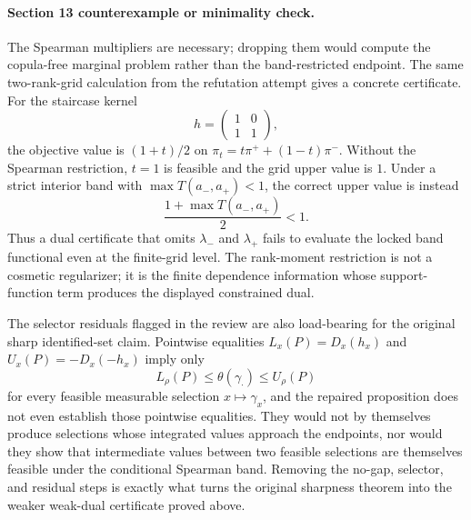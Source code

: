 \paragraph{Section 13 counterexample or minimality check.}
The Spearman multipliers are necessary; dropping them would compute the copula-free marginal problem rather than the band-restricted endpoint.  The same two-rank-grid calculation from the refutation attempt gives a concrete certificate.  For the staircase kernel
\[
h=\begin{pmatrix}1&0\\1&1\end{pmatrix},
\]
the objective value is \((1+t)/2\) on \(\pi_t=t\pi^+ +(1-t)\pi^-\).  Without the Spearman restriction, \(t=1\) is feasible and the grid upper value is \(1\).  Under a strict interior band with \(\max T(a_-,a_+)<1\), the correct upper value is instead
\[
\frac{1+\max T(a_-,a_+)}{2}<1.
\]
Thus a dual certificate that omits \(\lambda_-\) and \(\lambda_+\) fails to evaluate the locked band functional even at the finite-grid level.  The rank-moment restriction is not a cosmetic regularizer; it is the finite dependence information whose support-function term produces the displayed constrained dual.

The selector residuals flagged in the review are also load-bearing for the original sharp identified-set claim.  Pointwise equalities \(L_x(P)=D_x(h_x)\) and \(U_x(P)=-D_x(-h_x)\) imply only
\[
L_\rho(P)\le \theta(\gamma_\cdot)\le U_\rho(P)
\]
for every feasible measurable selection \(x\mapsto\gamma_x\), and the repaired proposition does not even establish those pointwise equalities.  They would not by themselves produce selections whose integrated values approach the endpoints, nor would they show that intermediate values between two feasible selections are themselves feasible under the conditional Spearman band.  Removing the no-gap, selector, and residual steps is exactly what turns the original sharpness theorem into the weaker weak-dual certificate proved above.
